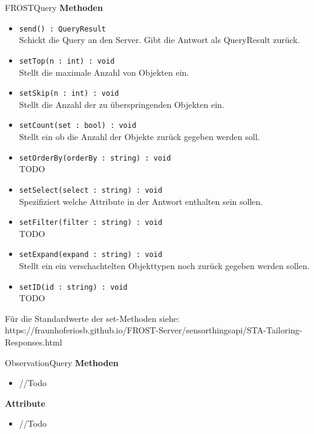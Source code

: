 \begin{Class}{FROSTQuery}
    \textbf{Methoden}
    \begin{itemize}
        \item \texttt{send() : QueryResult}
        \\Schickt die Query an den Server. Gibt die Antwort als QueryResult zurück.
        \item \texttt{setTop(n : int) : void}
        \\Stellt die maximale Anzahl von Objekten ein.
        \item \texttt{setSkip(n : int) : void}
        \\Stellt die Anzahl der zu überspringenden Objekten ein.
        \item \texttt{setCount(set : bool) : void}
        \\Stellt ein ob die Anzahl der Objekte zurück gegeben werden soll.
        \item \texttt{setOrderBy(orderBy : string) : void}
        \\TODO
        \item \texttt{setSelect(select : string) : void}
        \\Spezifiziert welche Attribute in der Antwort enthalten sein sollen.
        \item \texttt{setFilter(filter : string) : void}
        \\TODO
        \item \texttt{setExpand(expand : string) : void}
        \\Stellt ein ein verschachtelten Objekttypen noch zurück gegeben werden sollen.
        \item \texttt{setID(id : string) : void}
        \\TODO
    \end{itemize}
    Für die Standardwerte der set-Methoden siehe:
    \\https://fraunhoferiosb.github.io/FROST-Server/sensorthingsapi/STA-Tailoring-Responses.html
\end{Class}

\begin{Class}{ObservationQuery}
    \textbf{Methoden}
    \begin{itemize}
        \item //Todo
    \end{itemize}
    
    \textbf{Attribute}
    \begin{itemize}
        \item //Todo
    \end{itemize}
\end{Class}

